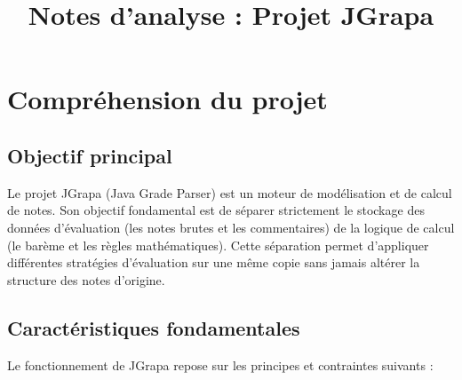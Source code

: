 \documentclass[11pt, a4paper]{article}
\title{Notes d'analyse : Projet JGrapa}
\author{}
\date{}
\begin{document}
\maketitle

\tableofcontents
\newpage

\section{Compréhension du projet}

\subsection{Objectif principal}
Le projet JGrapa (Java Grade Parser) est un moteur de modélisation et de calcul de notes. Son objectif fondamental est de séparer strictement le stockage des données d'évaluation (les notes brutes et les commentaires) de la logique de calcul (le barème et les règles mathématiques). Cette séparation permet d'appliquer différentes stratégies d'évaluation sur une même copie sans jamais altérer la structure des notes d'origine.

\subsection{Caractéristiques fondamentales}
Le fonctionnement de JGrapa repose sur les principes et contraintes suivants :
\end{document}
